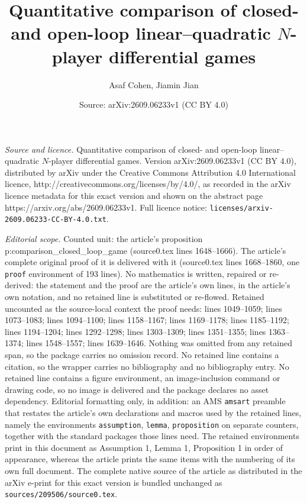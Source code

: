 \documentclass[10pt,a4paper]{amsart}
\title{Quantitative comparison of closed- and open-loop linear--quadratic $N$-player differential games}
\author{Asaf Cohen, Jiamin Jian}
\date{Source: arXiv:2609.06233v1 (CC BY 4.0)}
\begin{document}
\maketitle

\noindent\emph{Source and licence.} Quantitative comparison of closed- and open-loop linear--quadratic $N$-player differential games. Version arXiv:2609.06233v1 (CC BY 4.0), distributed by arXiv under the Creative Commons Attribution 4.0 International licence, http://creativecommons.org/licenses/by/4.0/, as recorded in the arXiv licence metadata for this exact version and shown on the abstract page https://arxiv.org/abs/2609.06233v1. Full licence notice: \texttt{licenses/arxiv-2609.06233-CC-BY-4.0.txt}.\par\smallskip

\noindent\textit{Editorial scope.} Counted unit: the article's proposition p:comparison\_closed\_loop\_game (source0.tex lines 1648--1666). The article's complete original proof of it is delivered with it (source0.tex lines 1668--1860, one \texttt{proof} environment of 193 lines). No mathematics is written, repaired or re-derived: the statement and the proof are the article's own lines, in the article's own notation, and no retained line is substituted or re-flowed.  Retained uncounted as the source-local context the proof needs: lines 1049--1059; lines 1073--1083; lines 1094--1100; lines 1158--1167; lines 1169--1178; lines 1185--1192; lines 1194--1204; lines 1292--1298; lines 1303--1309; lines 1351--1355; lines 1363--1374; lines 1548--1557; lines 1639--1646.  Nothing was omitted from any retained span, so the package carries no omission record.  No retained line contains a citation, so the wrapper carries no bibliography and no bibliography entry.  No retained line contains a figure environment, an image-inclusion command or drawing code, so no image is delivered and the package declares no asset dependency.  Editorial formatting only, in addition: an AMS \texttt{amsart} preamble that restates the article's own declarations and macros used by the retained lines, namely the environments \texttt{assumption}, \texttt{lemma}, \texttt{proposition} on separate counters, together with the standard packages those lines need.  The retained environments print in this document as Assumption 1, Lemma 1, Proposition 1 in order of appearance, whereas the article prints the same items with the numbering of its own full document.  The complete native source of the article as distributed in the arXiv e-print for this exact version is bundled unchanged as \texttt{sources/209506/source0.tex}.
\end{document}
